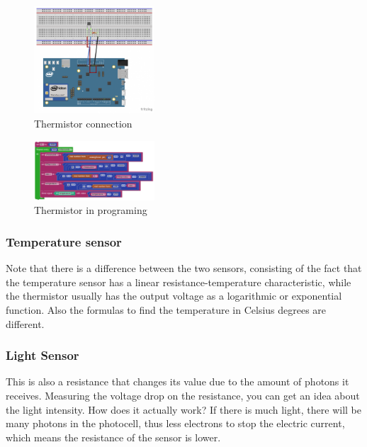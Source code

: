 \begin{figure}[ht]
    \centering
    \includegraphics[width=0.4\textwidth]{figures/Thermistor connection.png}
    \caption{Thermistor connection}
\end{figure}
\begin{figure}[ht]
    \centering
    \includegraphics[width=0.4\textwidth]{figures/Thermistor in programing.png}
    \caption{Thermistor in programing}
\end{figure}

\subsubsection{Temperature sensor}
Note that there is a difference between the two sensors, consisting of the fact that the temperature sensor has a linear resistance-temperature characteristic, while the thermistor usually has the output voltage as a logarithmic or exponential function. Also the formulas to find the temperature in Celsius degrees are different.

\subsubsection{Light Sensor}
This is also a resistance that changes its value due to the amount of photons it receives. Measuring the voltage drop on the resistance, you can get an idea about the light intensity. How does it actually work? If there is much light, there will be many photons in the photocell, thus less electrons to stop the electric current, which means the resistance of the sensor is lower.

